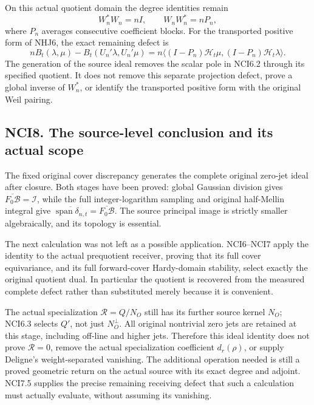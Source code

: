 On this actual quotient domain the degree identities remain \[
W_n^*W_n=nI,\qquad W_nW_n^*=nP_n,
\tag{NCI7.4}
\] where \(P_n\) averages consecutive coefficient blocks. For the
transported positive form of NHJ6, the exact remaining defect is \[
nB_t(\lambda,\mu)-B_t(U_n'\lambda,U_n'\mu)
=n\langle(I-P_n)\mathcal H_t\mu,(I-P_n)\mathcal H_t\lambda\rangle.
\tag{NCI7.5}
\] The generation of the source ideal removes the scalar pole in NCI6.2
through its specified quotient. It does not remove this separate
projection defect, prove a global inverse of \(W_n^*\), or identify the
transported positive form with the original Weil pairing.

\subsection{NCI8. The source-level conclusion and its actual
scope}\label{nci8.-the-source-level-conclusion-and-its-actual-scope}

The fixed original cover discrepancy generates the complete original
zero-jet ideal after closure. Both stages have been proved: global
Gaussian division gives \(\overline{F_0\mathcal B}=\mathcal I\), while
the full integer-logarithm sampling and original half-Mellin integral
give
\(\overline{\operatorname{span}\delta_{n,t}}=\overline{F_0\mathcal B}\).
The source principal image is strictly smaller algebraically, and its
topology is essential.

The next calculation was not left as a possible application. NCI6--NCI7
apply the identity to the actual prequotient receiver, proving that its
full cover equivariance, and its full forward-cover Hardy-domain
stability, select exactly the original quotient dual. In particular the
quotient is recovered from the measured complete defect rather than
substituted merely because it is convenient.

The actual specialization \(\mathcal R=Q/N_O\) still has its further
source kernel \(N_O\); NCI6.3 selects \(Q'\), not just \(N_O^\perp\).
All original nontrivial zero jets are retained at this stage, including
off-line and higher jets. Therefore this ideal identity does not prove
\(\mathcal R=0\), remove the actual specialization coefficient
\(d_r(\rho)\), or supply Deligne's weight-separated vanishing. The
additional operation needed is still a proved geometric return on the
actual source with its exact degree and adjoint. NCI7.5 supplies the
precise remaining receiving defect that such a calculation must actually
evaluate, without assuming its vanishing.

